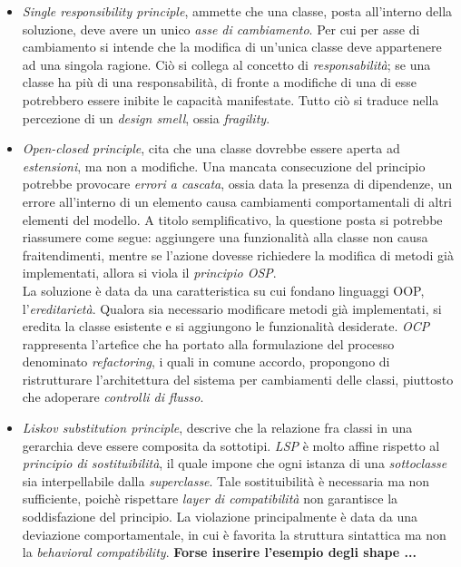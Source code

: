 \documentclass{article}
\begin{document}
\begin{itemize}[label={-}]
    \itemsep0em
    \item \textit{Single responsibility principle}, ammette che una classe, posta all'interno della soluzione, deve avere un unico \textit{asse di cambiamento}. Per cui per asse di cambiamento si intende che la modifica di un'unica classe deve appartenere ad una singola ragione. Ciò si collega al concetto di \textit{responsabilità}; se una classe ha più di una responsabilità, di fronte a modifiche di una di esse potrebbero essere inibite le capacità manifestate. Tutto ciò si traduce nella percezione di un \textit{design smell}, ossia \textit{fragility}. 
    \item \textit{Open-closed principle}, cita che una classe dovrebbe essere aperta ad \textit{estensioni}, ma non a modifiche. Una mancata consecuzione del principio potrebbe provocare \textit{errori a cascata}, ossia data la presenza di dipendenze, un errore all'interno di un elemento causa cambiamenti comportamentali di altri elementi del modello. A titolo semplificativo, la questione posta si potrebbe riassumere come segue: aggiungere una funzionalità alla classe non causa fraitendimenti, mentre se l'azione dovesse richiedere la modifica di metodi già implementati, allora si viola il \textit{principio OSP}.\vspace*{14pt}\\ La soluzione è data da una caratteristica su cui fondano linguaggi OOP, l'\textit{ereditarietà}. Qualora sia necessario modificare metodi già implementati, si eredita la classe esistente e si aggiungono le funzionalità desiderate. \textit{OCP} rappresenta l'artefice che ha portato alla formulazione del processo denominato \textit{refactoring}, i quali in comune accordo, propongono di ristrutturare l'architettura del sistema per cambiamenti delle classi, piuttosto che adoperare \textit{controlli di flusso}. 
    \item \textit{Liskov substitution principle}, descrive che la relazione fra classi in una gerarchia deve essere composita da sottotipi. \textit{LSP} è molto affine rispetto al \textit{principio di sostituibilità}, il quale impone che ogni istanza di una \textit{sottoclasse} sia interpellabile dalla \textit{superclasse}. Tale sostituibilità è necessaria ma non sufficiente, poichè rispettare \textit{layer di compatibilità} non garantisce la soddisfazione del principio. La violazione principalmente è data da una deviazione comportamentale, in cui è favorita la struttura sintattica ma non la \textit{behavioral compatibility}. \textbf{Forse inserire l'esempio degli shape ...}

\end{itemize}
\end{document}
